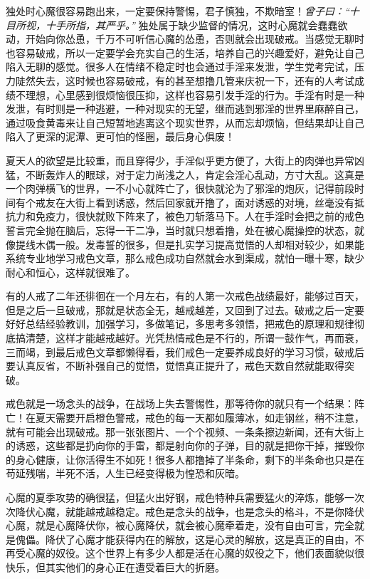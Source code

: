 独处时心魔很容易跑出来，一定要保持警惕，君子慎独，不欺暗室！\textit{曾子曰：“十目所视，十手所指，其严乎。”} 独处属于缺少监督的情况，这时心魔就会蠢蠢欲动，开始向你怂恿，千万不可听信心魔的怂恿，否则就会出现破戒。当感觉无聊时也容易破戒，所以一定要学会充实自己的生活，培养自己的兴趣爱好，避免让自己陷入无聊的感觉。很多人在情绪不稳定时也会通过手淫来发泄，学生党考完试，压力陡然失去，这时候也容易破戒，有的甚至想撸几管来庆祝一下，还有的人考试成绩不理想，心里感到很烦恼很压抑，这样也容易引发手淫的行为。手淫有时是一种发泄，有时则是一种逃避，一种对现实的无望，继而逃到邪淫的世界里麻醉自己，通过吸食黄毒来让自己短暂地逃离这个现实世界，从而忘却烦恼，但结果却让自己陷入了更深的泥潭、更可怕的怪圈，最后身心俱废！

夏天人的欲望是比较重，而且穿得少，手淫似乎更方便了，大街上的肉弹也异常凶猛，不断轰炸人的眼球，对于定力尚浅之人，肯定会淫心乱动，方寸大乱。这真是一个肉弹横飞的世界，一不小心就阵亡了，很快就沦为了邪淫的炮灰，记得前段时间有个戒友在大街上看到诱惑，然后回家就开撸了，面对诱惑的对境，丝毫没有抵抗力和免疫力，很快就败下阵来了，被色刀斩落马下。人在手淫时会把之前的戒色誓言完全抛在脑后，忘得一干二净，当时就只想着撸，处在被心魔操控的状态，就像提线木偶一般。发毒誓的很多，但是扎实学习提高觉悟的人却相对较少，如果能系统专业地学习戒色文章，那么戒色成功自然就会水到渠成，就怕一曝十寒，缺少耐心和恒心，这样就很难了。

有的人戒了二年还徘徊在一个月左右，有的人第一次戒色战绩最好，能够过百天，但是之后一旦破戒，那就是状态全无，越戒越差，又回到了过去。破戒之后一定要好好总结经验教训，加强学习，多做笔记，多思考多领悟，把戒色的原理和规律彻底搞清楚，这样才能越戒越好。光凭热情戒色是不行的，所谓一鼓作气，再而衰，三而竭，到最后戒色文章都懒得看，我们戒色一定要养成良好的学习习惯，破戒后要认真反省，不断补强自己的觉悟，觉悟真正提升了，戒色天数自然就能取得突破。

戒色就是一场念头的战争，在战场上失去警惕性，那等待你的就只有一个结果：阵亡！在夏天需要开启橙色警戒，戒色的每一天都如履薄冰，如走钢丝，稍不注意，就有可能会出现破戒。那一张张图片、一个个视频、一条条擦边新闻，还有大街上的诱惑，这些都是扔向你的手雷，都是射向你的子弹，目的就是把你干掉，摧毁你的身心健康，让你活得生不如死！很多人都撸掉了半条命，剩下的半条命也只是在苟延残喘，半死不活，人生已经变得极为惶恐和灰暗。

心魔的夏季攻势的确很猛，但猛火出好钢，戒色特种兵需要猛火的淬炼，能够一次次降伏心魔，就能越戒越稳定。戒色是念头的战争，也是念头的格斗，不是你降伏心魔，就是心魔降伏你，被心魔降伏，就会被心魔牵着走，没有自由可言，完全就是傀儡。降伏了心魔才能获得内在的解放，这是心灵的解放，这是真正的自由，不再受心魔的奴役。这个世界上有多少人都是活在心魔的奴役之下，他们表面貌似很快乐，但其实他们的身心正在遭受着巨大的折磨。

